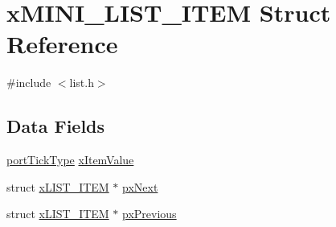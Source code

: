 \hypertarget{structx_m_i_n_i___l_i_s_t___i_t_e_m}{\section{x\-M\-I\-N\-I\-\_\-\-L\-I\-S\-T\-\_\-\-I\-T\-E\-M Struct Reference}
\label{structx_m_i_n_i___l_i_s_t___i_t_e_m}
}


{\ttfamily \#include $<$list.\-h$>$}

\subsection*{Data Fields}
\begin{DoxyCompactItemize}
\item 
\hyperlink{portmacro_8h_a4d746b2ff8fafc490b764c66411ec457}{port\-Tick\-Type} \hyperlink{structx_m_i_n_i___l_i_s_t___i_t_e_m_a83bf16246a7893527d5ea5d2aa7cc4bf}{x\-Item\-Value}
\item 
struct \hyperlink{structx_l_i_s_t___i_t_e_m}{x\-L\-I\-S\-T\-\_\-\-I\-T\-E\-M} $\ast$ \hyperlink{structx_m_i_n_i___l_i_s_t___i_t_e_m_aa3188b77b81a666e2f670d1942c37d90}{px\-Next}
\item 
struct \hyperlink{structx_l_i_s_t___i_t_e_m}{x\-L\-I\-S\-T\-\_\-\-I\-T\-E\-M} $\ast$ \hyperlink{structx_m_i_n_i___l_i_s_t___i_t_e_m_aeda19153a902efa73e3ee8662824d471}{px\-Previous}
\end{DoxyCompactItemize}


